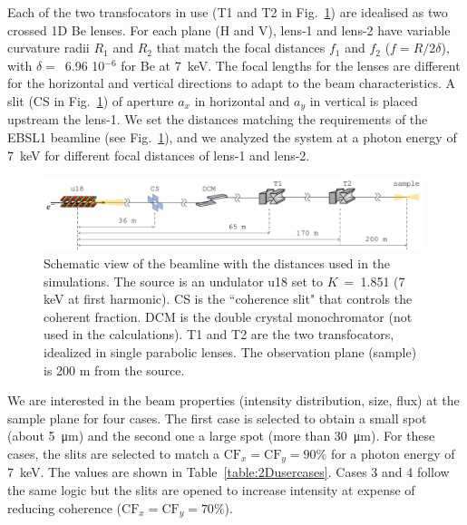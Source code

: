 \documentclass[preprint]{iucr}
\newcommand{\inred}[1]{{\color{red}#1}}
\newcommand{\whencolumns}[2]{#1}
\newcommand{\whencolumns}[2]{#2}
\begin{document}
Each of the two transfocators in use (T1 and T2 in Fig.~\ref{fig:beamline}) are idealised as two crossed 1D Be lenses. For each plane (H and V),
lens-1 and lens-2 have variable curvature radi\inred{i} $R_1$ and $R_2$ that match the focal distances $f_1$ and $f_2$ ($f=R/2\delta$), with $\delta=$~6.96 10$^{-6}$ for Be at \SI{7}{keV}. 
The focal lengths for the lenses are different for the horizontal and vertical directions to adapt to the beam characteristics.  
A slit (CS in Fig.~\ref{fig:beamline}) of aperture $a_x$ in horizontal and $a_y$ in vertical is placed upstream the lens-1. We set the distances matching the requirements of the EBSL1 beamline (see Fig.~\ref{fig:beamline}), and we analyzed the system at a photon energy of \SI{7}{keV} for different focal distances of lens-1 and lens-2. 
\whencolumns{}{\onecolumn}
\begin{figure}\label{fig:beamline}
    \includegraphics[width=0.99\textwidth]{figures/beamline.pdf}
    \caption{Schematic view of the beamline with the distances used in the simulations. The source is an undulator u18 set to $K$~=~1.851 (7 keV at first harmonic). CS is the ``coherence slit" that controls the coherent fraction. DCM is the double crystal monochromator (not used in the calculations). T1 and T2 are the two transfocators, idealized in single parabolic lenses. \inred{The} observation plane (sample) is 200 m from the source. 
    }
\end{figure}
\whencolumns{}{\twocolumn}


We are interested in the beam properties (intensity distribution, size, flux) at the sample plane for four cases.
The first case is selected to obtain a small spot (about \SI{5}{\micro\meter}) and the second one a large spot (more than \SI{30}{\micro\meter}). For these cases\inred{,} the slits are selected to match a $\text{CF}_{x}=\text{CF}_{y}=90\%$ for a photon energy of \SI{7}{keV}. The values are shown in Table~\ref{table:2Dusercases}. Cases 3 and 4 follow the same logic but the slits are opened to increase intensity at expense of reducing coherence  ($\text{CF}_{x}=\text{CF}_{y}=70\%$). 
\end{document}
